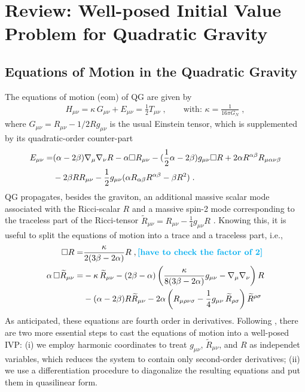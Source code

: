 \documentclass[a4paper,oneside,openany,11pt]{memoir}
\numberwithin{equation}{section} %
\newcommand{\aaron}[1]{{\color{cyan} #1}}
\begin{document}
\section{Review: Well-posed Initial Value Problem for Quadratic Gravity}
\label{sec:well-posedness}

\subsection{Equations of Motion in the Quadratic Gravity}

The equations of motion (eom) of QG are given by
\begin{align}
\label{eq:eom-QG}
	H_{\mu\nu}=\kappa\,G_{\mu\nu} + E_{\mu\nu}=\frac{1}{2}T_{\mu\nu}\;,
	\quad\quad
	\text{with: }\kappa = \frac{1}{16 \pi G_N}\;,
\end{align}
where $G_{\mu\nu} = R_{\mu\nu} -1/2 R g_{\mu\nu}$ is the usual Einstein tensor, which is supplemented by its quadratic-order counter-part
\begin{align}
	E_{\mu\nu} = &(\alpha-2\beta)\nabla_\mu\nabla_\nu R-\alpha \square R_{\mu\nu}-(\frac{1}{2}\alpha-2\beta)g_{\mu\nu}\square R
+2\alpha R^{\alpha\beta}R_{\mu\alpha\nu\beta}
	\notag\\
	&-2\beta R R_{\mu\nu}-\frac{1}{2}g_{\mu\nu}(\alpha R_{\alpha\beta}R^{\alpha\beta}-\beta R^2)\;.
\end{align}
QG propagates, besides the graviton, an additional massive scalar mode associated with the Ricci-scalar $R$ and a massive spin-2 mode corresponding to the traceless part of the Ricci-tensor $\widetilde{R}_{\mu\nu} = R_{\mu\nu} - \frac{1}{4}g_{\mu\nu}R$ \cite{Stelle:1977ry}. Knowing this, it is useful to split the equations of motion into a trace and a traceless part, i.e.,
\begin{align}
	\label{eq:eomForTraceRicci-1}
	\square R = &\frac{\kappa}{2(3\beta-2\alpha)}R\;,
	\textbf{\aaron{[have to check the factor of 2]}}
	\\
	\alpha\,\square \widetilde{R}_{\mu\nu} = &-\kappa\,\widetilde{R}_{\mu\nu} -(2\beta-\alpha) \left(\frac{\kappa}{8(3\beta-2\alpha)}g_{\mu\nu} -\nabla_\mu\nabla_\nu\right) R 
	\notag\\
	\label{eq:eomForTracelessRicci-1}
	&- (\alpha-2\beta) R\widetilde{R}_{\mu\nu}
	-2\alpha \left(R_{\mu\rho\nu\sigma} -\frac{1}{4} g_{\mu\nu}\, \widetilde{R}_{\rho\sigma}\right) \widetilde{R}^{\rho\sigma}
\end{align}
As anticipated, these equations are fourth order in derivatives.
Following \cite{Noakes:1983}, there are two more essential steps to cast the equations of motion into a well-posed IVP: (i) we employ harmonic coordinates to treat $g_{\mu\nu}$, $\widetilde{R}_{\mu\nu}$, and $R$ as independet variables, which reduces the system to contain only second-order derivatives; (ii) we use a differentiation procedure to diagonalize the resulting equations and put them in quasilinear form.
\end{document}
